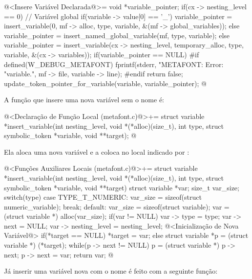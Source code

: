 \iniciocodigo
@<Insere Variável Declarada@>=
{
  void *variable_pointer;
  if(cx -> nesting_level == 0){ // Variável global
    if(variable -> value[0] == '_')
      variable_pointer = insert_variable(0, mf -> alloc, type, variable,
                                         &(mf -> global_variables));
    else
      variable_pointer = insert_named_global_variable(mf, type, variable);
  }
  else
    variable_pointer = insert_variable(cx -> nesting_level,
                                      temporary_alloc, type,
                                      variable, &(cx -> variables));
  if(variable_pointer == NULL){
#if defined(W_DEBUG_METAFONT)
      fprintf(stderr, "METAFONT: Error: %
                    "variable.\n", mf -> file, variable -> line);
#endif
    return false;
  }
  update_token_pointer_for_variable(variable, variable_pointer);
}
@
\fimcodigo

A função que insere uma nova variável sem o nome é:

\iniciocodigo
@<Declaração de Função Local (metafont.c)@>+=
struct variable *insert_variable(int nesting_level,
                                 void *(*alloc)(size_t),
                                 int type,
                                 struct symbolic_token *variable,
                                 void **target);
@
\fimcodigo

Ela aloca uma nova variável e a coloca no local indicado
por :

\iniciocodigo
@<Funções Auxiliares Locais (metafont.c)@>+=
struct variable *insert_variable(int nesting_level,
                                 void *(*alloc)(size_t),
                                 int type,
                                 struct symbolic_token *variable,
                                 void **target){
  struct variable *var;
  size_t var_size;
  switch(type){
    case TYPE_T_NUMERIC:
      var_size = sizeof(struct numeric_variable);
      break;
    default:
      var_size = sizeof(struct variable);
  }
  var = (struct variable *) alloc(var_size);
  if(var != NULL){
    var -> type = type;
    var -> next = NULL;
    var -> nesting_level = nesting_level;
    @<Inicialização de Nova Variável@>
  }
  if(*target == NULL)
    *target = var;
  else{
    struct variable *p = (struct variable *) (*target);
    while(p -> next != NULL)
      p = (struct variable *) p -> next;
    p -> next = var;
  }
  return var;
}
@
\fimcodigo

Já inserir uma variável nova com o nome é feito com a seguinte função:

